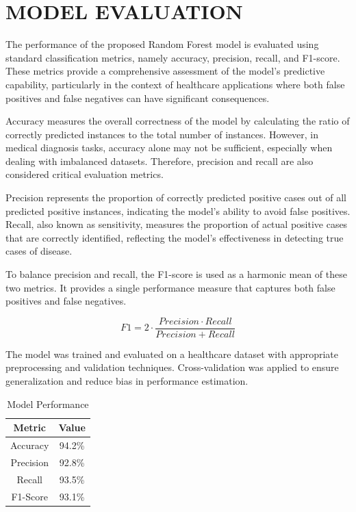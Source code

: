 \documentclass[conference]{IEEEtran}
\begin{document}
\section{MODEL EVALUATION}

The performance of the proposed Random Forest model is evaluated using standard classification metrics, namely accuracy, precision, recall, and F1-score. These metrics provide a comprehensive assessment of the model’s predictive capability, particularly in the context of healthcare applications where both false positives and false negatives can have significant consequences.

Accuracy measures the overall correctness of the model by calculating the ratio of correctly predicted instances to the total number of instances. However, in medical diagnosis tasks, accuracy alone may not be sufficient, especially when dealing with imbalanced datasets. Therefore, precision and recall are also considered critical evaluation metrics.

Precision represents the proportion of correctly predicted positive cases out of all predicted positive instances, indicating the model’s ability to avoid false positives. Recall, also known as sensitivity, measures the proportion of actual positive cases that are correctly identified, reflecting the model’s effectiveness in detecting true cases of disease.

To balance precision and recall, the F1-score is used as a harmonic mean of these two metrics. It provides a single performance measure that captures both false positives and false negatives.

\begin{equation}
F1 = 2 \cdot \frac{Precision \cdot Recall}{Precision + Recall}
\end{equation}

The model was trained and evaluated on a healthcare dataset with appropriate preprocessing and validation techniques. Cross-validation was applied to ensure generalization and reduce bias in performance estimation.

\begin{table}[htbp]
\caption{Model Performance}
\centering
\begin{tabular}{|c|c|}
\hline
Metric & Value \\
\hline
Accuracy & 94.2\% \\
Precision & 92.8\% \\
Recall & 93.5\% \\
F1-Score & 93.1\% \\
\hline
\end{tabular}
\end{table}
\end{document}
